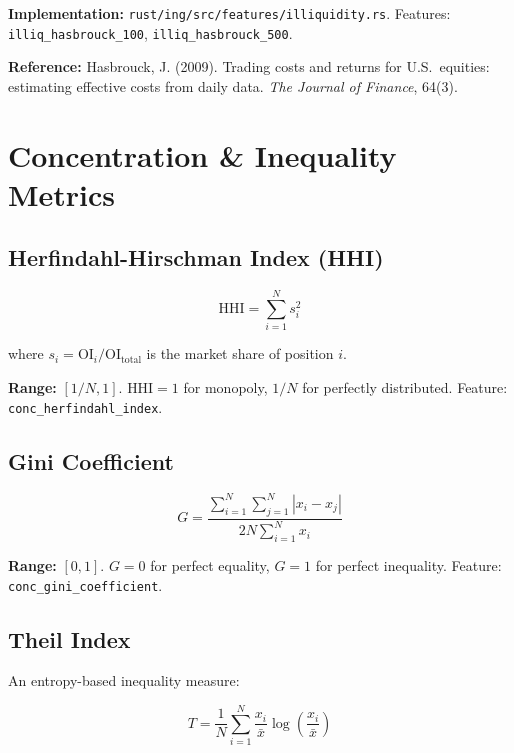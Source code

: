 \documentclass[11pt,a4paper]{article}
\begin{document}
\textbf{Implementation:} \texttt{rust/ing/src/features/illiquidity.rs}. Features: \texttt{illiq\_hasbrouck\_100}, \texttt{illiq\_hasbrouck\_500}.

\textbf{Reference:} Hasbrouck, J. (2009). Trading costs and returns for U.S.\ equities: estimating effective costs from daily data. \textit{The Journal of Finance}, 64(3).

\newpage
\section{Concentration \& Inequality Metrics}

\subsection{Herfindahl-Hirschman Index (HHI)}

\begin{equation}
\text{HHI} = \sum_{i=1}^{N} s_i^2
\end{equation}

where $s_i = \text{OI}_i / \text{OI}_{\text{total}}$ is the market share of position $i$.

\textbf{Range:} $[1/N, 1]$. $\text{HHI} = 1$ for monopoly, $1/N$ for perfectly distributed. Feature: \texttt{conc\_herfindahl\_index}.

\subsection{Gini Coefficient}

\begin{equation}
G = \frac{\sum_{i=1}^{N} \sum_{j=1}^{N} |x_i - x_j|}{2N \sum_{i=1}^{N} x_i}
\end{equation}

\textbf{Range:} $[0, 1]$. $G = 0$ for perfect equality, $G = 1$ for perfect inequality. Feature: \texttt{conc\_gini\_coefficient}.

\subsection{Theil Index}

An entropy-based inequality measure:

\begin{equation}
T = \frac{1}{N} \sum_{i=1}^{N} \frac{x_i}{\bar{x}} \log\left(\frac{x_i}{\bar{x}}\right)
\end{equation}
\end{document}
